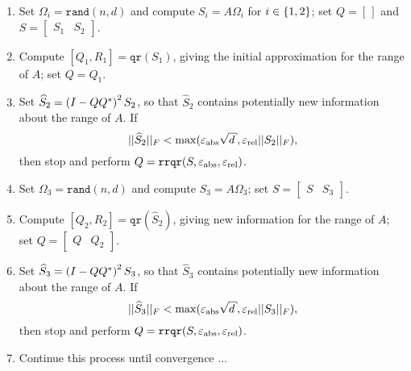 \begin{enumerate}

\item Set $\Omega_{i} = \texttt{rand}(n,d)$ and compute $S_{i} = A\Omega_{i}$
for $i\in\left\{ 1,2 \right\}$; set $Q = [\,]$ and
$S = \begin{bmatrix} S_{1} & S_{2} \end{bmatrix}$.

\item Compute $[Q_{1},R_{1}] = \texttt{qr}(S_{1})$,
giving the initial approximation for the range of $A$; set $Q = Q_{1}$.

\item Set $\widehat{S}_{2} = \left( I-QQ^{*} \right)^{2}S_{2}$, so that
$\widehat{S}_{2}$ contains potentially new information
about the range of $A$.
If
%
\begin{equation}
    ||\widehat{S}_{2}||_{F} < \max(\epsa\sqrt{d},\epsr||S_{2}||_{F}),
\end{equation}
%
then stop and perform $Q = \texttt{rrqr}(S,\varepsilon_{\text{abs}},\varepsilon_{\text{rel}})$.

\item Set $\Omega_{3} = \texttt{rand}(n,d)$ and compute $S_{3} = A\Omega_{3}$;
set $S = \begin{bmatrix} S & S_{3} \end{bmatrix}$.

\item Compute $[Q_{2},R_{2}] = \texttt{qr}(\widehat{S}_{2})$,
giving new information for the range of $A$;
set $Q = \begin{bmatrix} Q & Q_{2} \end{bmatrix}$.

\item Set $\widehat{S}_{3} = \left( I-QQ^{*} \right)^{2}S_{3}$, so that
$\widehat{S}_{3}$ contains potentially new information
about the range of $A$.
If
%
\begin{equation}
    ||\widehat{S}_{3}||_{F} < \max(\epsa\sqrt{d},\epsr||S_{3}||_{F}),
\end{equation}
%
then stop and perform $Q = \texttt{rrqr}(S,\varepsilon_{\text{abs}},\varepsilon_{\text{rel}})$.

\item Continue this process until convergence $\dots$

\end{enumerate}

